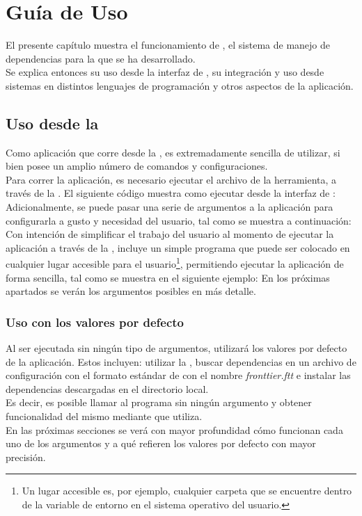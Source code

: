 \section{Guía de Uso}
\label{sec:guide}

El presente capítulo muestra el funcionamiento de \fronttier, el
sistema de manejo de dependencias para la \viewtier que se ha
desarrollado.\\
Se explica entonces su uso desde la interfaz de \cli, su integración
y uso desde sistemas en distintos lenguajes
de programación y otros aspectos de la aplicación.\\

\subsection{Uso desde la \cli}
\label{subsec:guide:cli}

Como aplicación que corre desde la \cli, \fronttier es
extremadamente sencilla de utilizar, si bien posee un amplio número
de comandos y configuraciones.\\
Para correr la aplicación, es necesario ejecutar el archivo \jar
de la herramienta, a través de la \jvm.
El siguiente código muestra como ejecutar \fronttier desde la interfaz
de \cli:
Adicionalmente, se puede pasar una serie de argumentos a la aplicación
para configurarla a gusto y necesidad del usuario, tal como se muestra
a continuación:
Con intención de simplificar el trabajo del usuario al momento de ejecutar la
aplicación a través de la \cli, \fronttier incluye
un simple programa que puede ser colocado en cualquier lugar accesible
para el usuario\footnote{
	Un lugar accesible es, por ejemplo, cualquier carpeta que se
	encuentre dentro de la variable de entorno  en el sistema
	operativo del usuario.
}, permitiendo ejecutar la aplicación de forma sencilla, tal como
se muestra en el siguiente ejemplo:
En los próximas apartados se verán los argumentos posibles en más
detalle.

\subsubsection{Uso con los valores por defecto}
\label{subsubsec:guide:defaults}

Al ser ejecutada sin ningún tipo de argumentos, \fronttier utilizará los
valores por defecto de la aplicación. Estos incluyen: utilizar la
\cacheg, buscar dependencias en un archivo de
configuración con el formato estándar de \fronttier con el nombre
\emph{fronttier.ftt} e instalar las dependencias descargadas en el directorio
local.\\
Es decir, es posible llamar al programa sin ningún argumento y obtener
funcionalidad del mismo mediante  que \fronttier
utiliza.\\
En las próximas secciones se verá con mayor profundidad cómo funcionan
cada uno de los argumentos y a qué refieren los valores por defecto con
mayor precisión.

